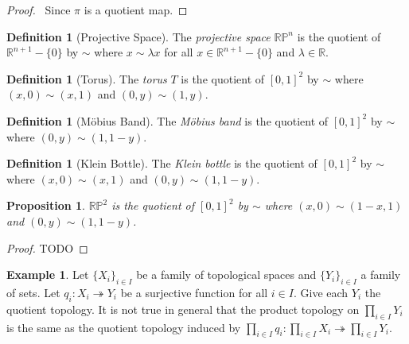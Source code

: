 \documentclass{book}
\let\qed\relax
\newtheorem{prop}[ax]{Proposition}
\theoremstyle{definition}
\newtheorem{df}[ax]{Definition}
\newtheorem{ex}[ax]{Example}
\begin{document}
\begin{proof}
\pf\ Since $\pi$ is a quotient map. \qed
\end{proof}

\begin{df}[Projective Space]
The \emph{projective space} $\mathbb{RP}^n$ is the quotient of $\mathbb{R}^{n+1} - \{0\}$ by $\sim$ where $x \sim \lambda x$ for all $x \in \mathbb{R}^{n+1} - \{0\}$ and $\lambda \in \mathbb{R}$.
\end{df}

\begin{df}[Torus]
The \emph{torus} $T$ is the quotient of $[0,1]^2$ by $\sim$ where $(x,0) \sim (x,1)$ and $(0,y) \sim (1,y)$.
\end{df}

\begin{df}[M\"{o}bius Band]
The \emph{M\"{o}bius band} is the quotient of $[0,1]^2$ by $\sim$ where $(0,y) \sim (1,1-y)$.
\end{df}

\begin{df}[Klein Bottle]
The \emph{Klein bottle} is the quotient of $[0,1]^2$ by $\sim$ where $(x,0) \sim (x,1)$ and $(0,y) \sim (1,1-y)$.
\end{df}

\begin{prop}
$\mathbb{RP}^2$ is the quotient of $[0,1]^2$ by $\sim$ where $(x,0) \sim (1-x,1)$ and $(0,y) \sim (1,1-y)$.
\end{prop}

\begin{proof}
\pf TODO
\end{proof}

\begin{ex}
Let $\{X_i\}_{i \in I}$ be a family of topological spaces and $\{Y_i\}_{i \in I}$ a family of sets. Let $q_i : X_i \twoheadrightarrow Y_i$ be a surjective function for all $i \in I$. Give each $Y_i$ the quotient topology. It is not true in general that the product topology on $\prod_{i \in I} Y_i$ is the same as the quotient topology induced by $\prod_{i \in I} q_i : \prod_{i \in I} X_i \twoheadrightarrow \prod_{i \in I} Y_i$.
\end{ex}
\end{document}
